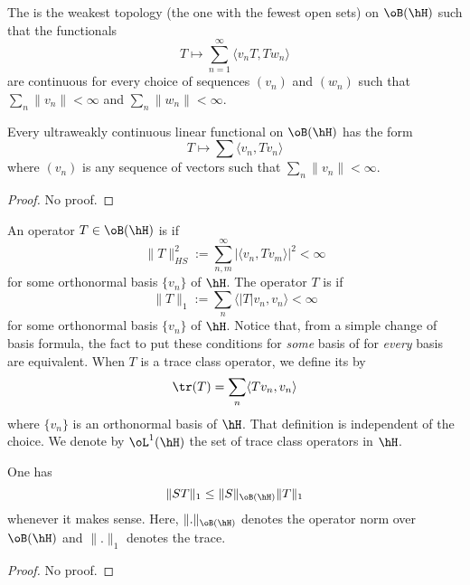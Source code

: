 \begin{definition}
The  is the weakest topology (the one with the fewest open sets) on $\oB(\hH)$ such that the functionals
\begin{equation}
	T\mapsto \sum_{n=1}^{\infty}\langle v_nT, Tw_n\rangle 
\end{equation}
are continuous for every choice of sequences $(v_n)$ and $(w_n)$ such that $\sum_n\| v_n \|<\infty$ and $\sum_n\| w_n \|<\infty$.
\end{definition}

\begin{proposition}
Every ultraweakly continuous linear functional on $\oB(\hH)$ has the form
\begin{equation}
	T\mapsto\sum\langle v_n, Tv_n\rangle 
\end{equation}
where $(v_n)$ is any sequence of vectors such that $\sum_n\| v_n \|<\infty$.
\end{proposition}

\begin{proof}
No proof.
\end{proof}

An operator $T\in\oB(\hH)$ is  if
\begin{equation}
	\| T \|_{HS}^2:=\sum_{n,m}^{\infty}| \langle v_n, Tv_m\rangle  |^2<\infty
\end{equation}
for some orthonormal basis $\{ v_n \}$ of $\hH$. The operator $T$ is  if
\begin{equation}
	\| T \|_1:=\sum_n\langle | T |v_n, v_n\rangle <\infty
\end{equation}
for some orthonormal basis $\{ v_n \}$ of $\hH$. Notice that, from a simple change of basis formula, the fact to put these conditions for \emph{some} basis of for \emph{every} basis are equivalent. When $T$ is a trace class operator, we define its  by
\begin{equation}
	\tr(T)=\sum_n\langle Tv_n, v_n\rangle 
\end{equation}
where $\{ v_n \}$ is an orthonormal basis of $\hH$. That definition is independent of the choice. We denote by $\oL^1(\hH)$ the set of trace class operators in $\hH$. 

\begin{proposition}
One has
\begin{equation}
	\| ST \|_1\leq \| S \|_{\oB(\hH)}\| T \|_1
\end{equation}
whenever it makes sense. Here, $\| . \|_{\oB(\hH)}$ denotes the operator norm over $\oB(\hH)$ and $\| . \|_1$ denotes the trace.
\end{proposition}
\begin{proof}
No proof.
\end{proof}

